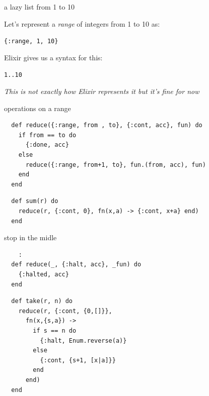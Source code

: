\begin{frame}{a lazy list from 1 to 10}

  Let's represent a {\em range} of integers from 1 to 10 as:

  \vspace{10pt}\hspace{20pt} {\tt \{:range, 1, 10\}}

  \vspace{10pt}\pause

  Elixir gives us a syntax for this:

    \vspace{10pt}\hspace{20pt} {\tt 1..10}
  

    
  \vspace{40pt}\pause
  {\em This is not exactly how Elixir represents it but it's fine for now}

\end{frame}

\begin{frame}[fragile]{operations on a range}

  
\begin{verbatim}
  def reduce({:range, from , to}, {:cont, acc}, fun) do
    if from == to do
      {:done, acc}
    else
      reduce({:range, from+1, to}, fun.(from, acc), fun)
    end
  end
\end{verbatim}

  \pause
  
\begin{verbatim}
  def sum(r) do
    reduce(r, {:cont, 0}, fn(x,a) -> {:cont, x+a} end)
  end
\end{verbatim}

  
\end{frame}

\begin{frame}[fragile]{stop in the midle}

\begin{verbatim}
    :
  def reduce(_, {:halt, acc}, _fun) do
    {:halted, acc}
  end
\end{verbatim}

\pause
\begin{verbatim}
  def take(r, n) do
    reduce(r, {:cont, {0,[]}},
      fn(x,{s,a}) ->
        if s == n do
          {:halt, Enum.reverse(a)}
        else
          {:cont, {s+1, [x|a]}}
        end
      end)
  end    
\end{verbatim}
  
\pause


  
\end{frame}



